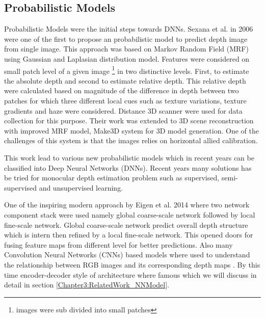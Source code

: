 \subsection{Probabilistic Models}
\label{Chapter3:RelatedWork_ProbabilisticModel}
Probabilistic Models were the initial steps towards DNNs. Sexana et al. \cite{saxena2006learning} in 2006 were one of the first to propose an probabilistic model to predict depth image from single image. This approach was based on Markov Random Field (MRF) using Gaussian and Laplasian distribution model. Features were considered on small patch level of a given image \footnote{images were sub divided into small patches} in two distinctive levels. First, to estimate the absolute depth and second to estimate relative depth. This relative depth were calculated based on magnitude of the difference in depth between two patches for which three different local cues such as texture variations, texture gradients and haze were considered. Distance 3D scanner were used for data collection for this purpose. Their work was extended to 3D scene reconstruction with improved MRF model, Make3D \cite{saxena2008make3d} system for 3D model generation. One of the challenges of this system is that the images relies on horizontal allied calibration. 

This work lead to various new probabilistic models which in recent years can be classified into Deep Neural Networks (DNNs). Recent years many solutions has be tried for monocular depth estimation problem such as supervised, semi-supervised and unsupervised learning.   

One of the inspiring modern approach by Eigen et al. 2014 \cite{eigen2014depth} where two network component stack were used namely global coarse-scale network followed by local fine-scale network. Global coarse-scale network predict overall depth structure which is intern then refined by a local fine-scale network. This opened doors for fusing feature maps from different level for better predictions.
Also many Convolution Neural Networks (CNNs) based models where used to understand the relationship between RGB images and its corresponding depth maps \cite{liu2015deep,laina2016deeper,Eigen_2015_ICCV,eigen2014depth, Alhashim2018}. By this time encoder-decoder style of architecture where famous\cite{Alhashim2018, hu2019revisiting} which we will discuss in detail in section \ref{Chapter3:RelatedWork_NNModel}. 

